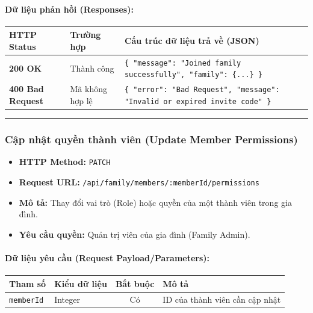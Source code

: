 \documentclass[12pt,a4paper]{article}
\begin{document}
\paragraph{Dữ liệu phản hồi (Responses):}
\begin{longtable}{|>{\raggedright\arraybackslash}p{2.8cm}|>{\raggedright\arraybackslash}p{3.2cm}|>{\raggedright\arraybackslash}p{8.0cm}|}
\hline
\textbf{HTTP Status} & \textbf{Trường hợp} & \textbf{Cấu trúc dữ liệu trả về (JSON)} \\ \hline
\endhead
\textbf{200 OK} & Thành công & \texttt{\{ "message": "Joined family successfully", "family": \{...\} \}} \\ \hline
\textbf{400 Bad Request} & Mã không hợp lệ & \texttt{\{ "error": "Bad Request", "message": "Invalid or expired invite code" \}} \\ \hline
\end{longtable}

\vskip 0.4cm
\noindent\rule{\textwidth}{0.3pt}
\vskip 0.4cm

\subsubsection{Cập nhật quyền thành viên (Update Member Permissions)}
\begin{itemize}[leftmargin=*]
    \item \textbf{HTTP Method:} \texttt{PATCH}
    \item \textbf{Request URL:} \texttt{/api/family/members/:memberId/permissions}
    \item \textbf{Mô tả:} Thay đổi vai trò (Role) hoặc quyền của một thành viên trong gia đình.
    \item \textbf{Yêu cầu quyền:} Quản trị viên của gia đình (Family Admin).
\end{itemize}

\paragraph{Dữ liệu yêu cầu (Request Payload/Parameters):}
\begin{longtable}{|>{\raggedright\arraybackslash}p{2.8cm}|>{\raggedright\arraybackslash}p{2.2cm}|c|>{\raggedright\arraybackslash}p{7.0cm}|}
\hline
\textbf{Tham số} & \textbf{Kiểu dữ liệu} & \textbf{Bắt buộc} & \textbf{Mô tả} \\ \hline
\endhead
\texttt{memberId} & Integer & Có & ID của thành viên cần cập nhật \\ \hline
\end{longtable}
\end{document}
